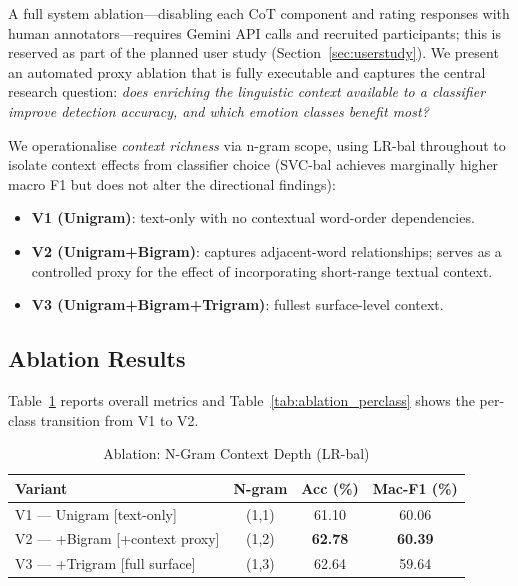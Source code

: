 \documentclass[sigconf, review=true]{acmart}
\begin{document}
A full system ablation---disabling each CoT component and
rating responses with human annotators---requires Gemini API
calls and recruited participants; this is reserved as part of
the planned user study (Section~\ref{sec:userstudy}).
We present an automated proxy ablation that is fully executable
and captures the central research question: \emph{does
enriching the linguistic context available to a classifier
improve detection accuracy, and which emotion classes benefit
most?}

We operationalise \emph{context richness} via n-gram scope,
using LR-bal throughout to isolate context effects from
classifier choice (SVC-bal achieves marginally higher macro F1
but does not alter the directional findings):
\begin{itemize}
    \item \textbf{V1 (Unigram)}: text-only with no contextual
          word-order dependencies.
    \item \textbf{V2 (Unigram+Bigram)}: captures adjacent-word
          relationships; serves as a controlled proxy for the
          effect of incorporating short-range textual context.
    \item \textbf{V3 (Unigram+Bigram+Trigram)}: fullest
          surface-level context.
\end{itemize}

\subsection{Ablation Results}

Table~\ref{tab:ablation} reports overall metrics and
Table~\ref{tab:ablation_perclass} shows the per-class
transition from V1 to V2.

\begin{table}[htbp]
\centering
\caption{Ablation: N-Gram Context Depth (LR-bal)}
\label{tab:ablation}
\begin{tabular}{lccc}
\toprule
\textbf{Variant} & \textbf{N-gram} & \textbf{Acc (\%)} &
\textbf{Mac-F1 (\%)} \\
\midrule
V1 --- Unigram [text-only]          & (1,1) & 61.10 & 60.06 \\
V2 --- +Bigram [+context proxy]     & (1,2) & \textbf{62.78} &
\textbf{60.39} \\
V3 --- +Trigram [full surface]      & (1,3) & 62.64 & 59.64 \\
\bottomrule
\end{tabular}
\end{table}
\end{document}
